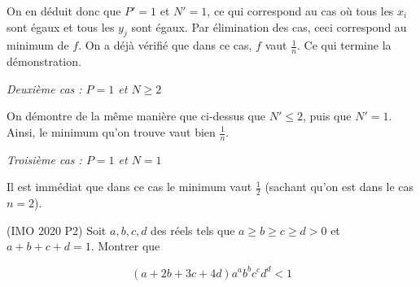 \begin{sol}
On en déduit donc que $P'=1$ et $N'=1$, ce qui correspond au cas où tous les $x_i$ sont égaux et tous les $y_j$ sont égaux. Par élimination des cas, ceci correspond au minimum de $f$. On a déjà vérifié que dans ce cas, $f$ vaut $\frac1{n}$. Ce qui termine la démonstration.

\textit{Deuxième cas : $P=1$ et $N \geq 2$}

On démontre de la même manière que ci-dessus que $N' \leq 2$, puis que $N'=1$. Ainsi, le minimum qu'on trouve vaut bien $\frac1{n}$.

\textit{Troisième cas : $P=1$ et $N=1$}

Il est immédiat que dans ce cas le minimum vaut $\frac12$ (sachant qu'on est dans le cas $n=2$).
\end{sol}

\begin{exo}
(IMO 2020 P2) 
Soit $a,b,c,d$ des réels tels que $a\geqslant b \geqslant c\geqslant d >0$ et $a+b+c+d=1$. Montrer que 

\[(a+2b+3c+4d)a^ab^bc^cd^d<1\] 

\end{exo}

